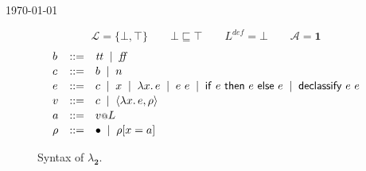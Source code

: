 \documentclass{article}
\makeatletter
\theoremstyle{definition}
\newcommand{\at}{\ensuremath{{\scriptstyle{@}}}}
\makeatother
\begin{document}
\begin{flushright}
  \today
\end{flushright}

\begin{figure}[ht]
  \centering
  \[
  \mathcal{L} = \{ \bot, \top \}
  \qquad
  \bot \sqsubseteq \top
  \qquad
  L^{\mathit{def}} = \bot
  \qquad
  \mathcal{A} = \mathbf{1}
  \]
  \[
  \begin{array}[t]{lcl}
    b & ::= &
    \mathit{tt}\;\; |\;\;
    \mathit{ff}
    \\[0.3ex]
    c & :: = &
    b\;\; |\;\;
    n
    \\[0.3ex]
    e & ::= &
    c\;\; |\;\;
    x\;\; |\;\;
    \lambda{x}.\, e\;\; |\;\;
    e\ e\;\; |\;\;
    \mathsf{if}\ e\ \mathsf{then}\ e\ \mathsf{else}\ e\;\; |\;\;
    \mathsf{declassify}\ e\ e
    \\[0.3ex]
    v & ::= &
    c\;\; |\;\;
    \langle{\lambda{x}.\, e, \rho\rangle}
    \\[0.3ex]
    a & ::= &
    v \at L
    \\[0.3ex]
    \rho & ::= &
    \bullet\;\; |\;\;
    \rho[x = a]
  \end{array}
  \]
  \caption{Syntax of $\lambda_{\mathbf{2}}$.}
  \label{fig:syntax}
\end{figure}
\end{document}

